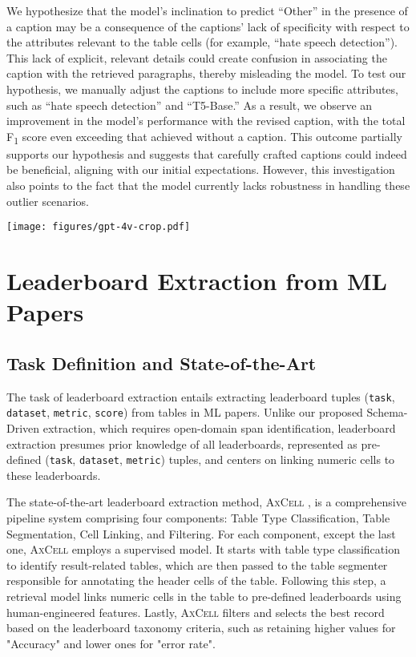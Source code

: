 \documentclass[11pt]{article}
\newcommand\axcell{\textsc{AxCell}}
\begin{document}
We hypothesize that the model's inclination to predict ``Other'' in the presence of a caption may be a consequence of the captions' lack of specificity with respect to the attributes relevant to the table cells (for example, ``hate speech detection''). This lack of explicit, relevant details could create confusion in associating the caption with the retrieved paragraphs, thereby misleading the model.
To test our hypothesis, we manually adjust the captions to include more specific attributes, such as ``hate speech detection'' and ``T5-Base.'' As a result, we observe an improvement in the model's performance with the revised caption, with the total F\textsubscript{1} score even exceeding that achieved without a caption. This outcome partially supports our hypothesis and suggests that carefully crafted captions could indeed be beneficial, aligning with our initial expectations. However, this investigation also points to the fact that the model currently lacks robustness in handling these outlier scenarios.


\begin{figure*}[ht!]
    \centering
    \texttt{[image: figures/gpt-4v-crop.pdf]}
    \caption{Generate \LaTeX~code for image tables using GPT-4V. 
}
    \label{fig:gpt-4v}
\end{figure*}


\section{Leaderboard Extraction from ML Papers}
\label{sec:axcell_details}

\subsection{Task Definition and State-of-the-Art}
The task of leaderboard extraction entails extracting leaderboard tuples (\texttt{task}, \texttt{dataset}, \texttt{metric}, \texttt{score}) from tables in ML papers. Unlike our proposed Schema-Driven extraction, which requires open-domain span identification, leaderboard extraction presumes prior knowledge of all leaderboards, represented as pre-defined (\texttt{task}, \texttt{dataset}, \texttt{metric}) tuples, and centers on linking numeric cells to these leaderboards. 

The state-of-the-art leaderboard extraction method, \axcell{} \cite{kardas-etal-2020-axcell}, is a comprehensive pipeline system comprising four components: Table Type Classification, Table Segmentation, Cell Linking, and Filtering. For each component, except the last one, \axcell{} employs a supervised model. It starts with table type classification to identify result-related tables, which are then passed to the table segmenter responsible for annotating the header cells of the table. Following this step, a retrieval model links numeric cells in the table to pre-defined leaderboards using human-engineered features. Lastly, \axcell{} filters and selects the best record based on the leaderboard taxonomy criteria, such as retaining higher values for "Accuracy" and lower ones for "error rate".
\end{document}
